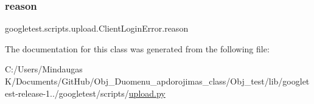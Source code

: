 \subsubsection{\texorpdfstring{reason}{reason}}
{\footnotesize\ttfamily googletest.\+scripts.\+upload.\+Client\+Login\+Error.\+reason}



The documentation for this class was generated from the following file\+:\begin{DoxyCompactItemize}
\item 
C\+:/\+Users/\+Mindaugas K/\+Documents/\+Git\+Hub/\+Obj\+\_\+\+Duomenu\+\_\+apdorojimas\+\_\+class/\+Obj\+\_\+test/lib/googletest-\/release-\/1../googletest/scripts/\mbox{\hyperlink{_obj__test_2lib_2googletest-release-1_88_81_2googletest_2scripts_2upload_8py}{upload.\+py}}\end{DoxyCompactItemize}

